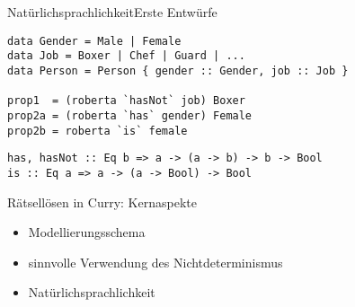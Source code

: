 \documentclass[hyperref={pdfpagelabels=false}]{beamer}
\begin{document}
\begin{frame}[fragile]{Nat\"urlichsprachlichkeit}{Erste Entw\"urfe}
\begin{lstlisting}
data Gender = Male | Female
data Job = Boxer | Chef | Guard | ...
data Person = Person { gender :: Gender, job :: Job }

prop1  = (roberta `hasNot` job) Boxer
prop2a = (roberta `has` gender) Female
prop2b = roberta `is` female
\end{lstlisting}

\pause

\begin{lstlisting}
has, hasNot :: Eq b => a -> (a -> b) -> b -> Bool
is :: Eq a => a -> (a -> Bool) -> Bool
\end{lstlisting}
\end{frame}

\begin{frame}{R\"atsell\"osen in Curry: Kernaspekte}
\begin{itemize}
\item Modellierungsschema
\item sinnvolle Verwendung des Nichtdeterminismus
\item Nat\"urlichsprachlichkeit
\end{itemize}
\end{frame}
\end{document}
